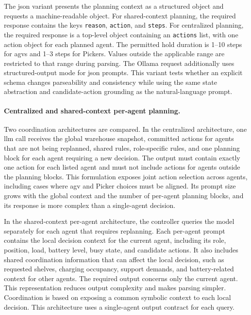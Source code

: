 The \gls{json} variant presents the planning context as a structured object and requests a machine-readable object.
For shared-context planning, the required response contains the keys \texttt{reason}, \texttt{action}, and \texttt{steps}.
For centralized planning, the required response is a top-level object containing an \texttt{actions} list, with one action object for each planned agent.
The permitted hold duration is 1--10 steps for \glspl{agv} and 1--3 steps for Pickers. Values outside the applicable range are restricted to that range during parsing.
The Ollama request additionally uses structured-output mode for \gls{json} prompts.
This variant tests whether an explicit schema changes parseability and consistency while using the same state abstraction and candidate-action grounding as the natural-language prompt.

\paragraph{Centralized and shared-context per-agent planning.}
Two coordination architectures are compared.
In the centralized architecture, one \gls{llm} call receives the global warehouse snapshot, committed actions for agents that are not being replanned, shared rules, role-specific rules, and one planning block for each agent requiring a new decision.
The output must contain exactly one action for each listed agent and must not include actions for agents outside the planning blocks.
This formulation exposes joint action selection across agents, including cases where \gls{agv} and Picker choices must be aligned.
Its prompt size grows with the global context and the number of per-agent planning blocks, and its response is more complex than a single-agent decision.

In the shared-context per-agent architecture, the controller queries the model separately for each agent that requires replanning.
Each per-agent prompt contains the local decision context for the current agent, including its role, position, load, battery level, busy state, and candidate actions.
It also includes shared coordination information that can affect the local decision, such as requested shelves, charging occupancy, support demands, and battery-related context for other agents.
The required output concerns only the current agent.
This representation reduces output complexity and makes parsing simpler.
Coordination is based on exposing a common symbolic context to each local decision.
This architecture uses a single-agent output contract for each query.

